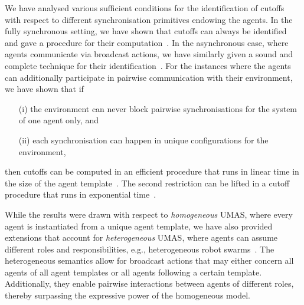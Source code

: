 \documentclass{article}
\begin{document}

We have analysed various sufficient conditions for the identification of cutoffs
with respect to different  synchronisation primitives endowing the agents.  In
the fully synchronous setting, we have shown that cutoffs can always be
identified and gave a procedure for their
computation~\cite{KouvarosLomuscio15b}.
In the asynchronous case, where agents communicate via broadcast actions, we
have similarly given a sound and complete technique for their
identification~\cite{KouvarosLomuscio13a}. For the instances where the agents
can additionally participate in pairwise communication with their environment,
we have shown that if 
\begin{itemize}
	\item[(i)] the environment can never block pairwise synchronisations
for the system of one agent only, and
	\item[(ii)] each synchronisation can happen in unique
configurations for the environment,
\end{itemize}
then  cutoffs can be computed in an efficient procedure that runs in linear time
in the size of the agent template~\cite{KouvarosLomuscio13b}. The second
restriction can be lifted in a cutoff procedure that runs in exponential
time~\cite{KouvarosLomuscio15}. 

While the results were drawn with respect to {\em homogeneous} UMAS, where every
agent is instantiated from a unique agent template, we have also provided
extensions that account for {\em heterogeneous} UMAS, where agents can assume
different roles and responsibilities, e.g., heterogeneous robot
swarms~\cite{KouvarosLomuscio16a}. The heterogeneous semantics allow for
broadcast actions that may either concern all agents of all agent templates or
all agents following a certain template. Additionally, they enable pairwise
interactions between agents of different roles, thereby surpassing the
expressive power of the homogeneous model.
\end{document}
